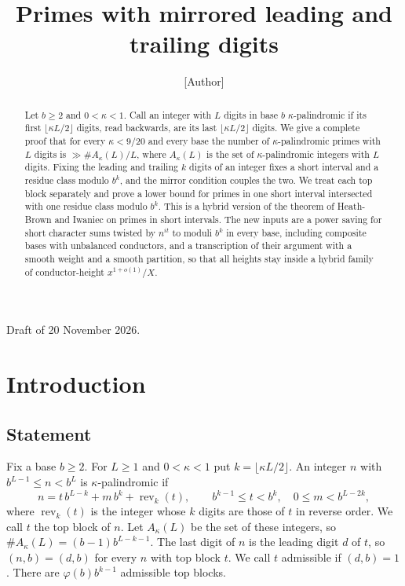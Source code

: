 \documentclass[11pt]{amsart}
\title{Primes with mirrored leading and trailing digits}
\author{[Author]}
\date{}
\theoremstyle{definition}
\numberwithin{equation}{section}
\newcommand{\rev}{\operatorname{rev}}
\begin{document}
\begin{abstract}
Let $b\ge2$ and $0<\kappa<1$. Call an integer with $L$ digits in base $b$ $\kappa$-palindromic if its first $\lfloor\kappa L/2\rfloor$ digits, read backwards, are its last $\lfloor\kappa L/2\rfloor$ digits. We give a complete proof that for every $\kappa<9/20$ and every base the number of $\kappa$-palindromic primes with $L$ digits is $\gg\#A_\kappa(L)/L$, where $A_\kappa(L)$ is the set of $\kappa$-palindromic integers with $L$ digits. Fixing the leading and trailing $k$ digits of an integer fixes a short interval and a residue class modulo $b^k$, and the mirror condition couples the two. We treat each top block separately and prove a lower bound for primes in one short interval intersected with one residue class modulo $b^k$. This is a hybrid version of the theorem of Heath-Brown and Iwaniec on primes in short intervals. The new inputs are a power saving for short character sums twisted by $n^{it}$ to moduli $b^k$ in every base, including composite bases with unbalanced conductors, and a transcription of their argument with a smooth weight and a smooth partition, so that all heights stay inside a hybrid family of conductor-height $x^{1+o(1)}/X$.
\end{abstract}

\maketitle

\noindent Draft of 20 November 2026.

\section{Introduction}

\subsection{Statement}
Fix a base $b\ge2$. For $L\ge1$ and $0<\kappa<1$ put $k=\lfloor\kappa L/2\rfloor$. An integer $n$ with $b^{L-1}\le n<b^L$ is $\kappa$-palindromic if
\[
n=t\,b^{L-k}+m\,b^k+\rev_k(t),\qquad b^{k-1}\le t<b^k,\quad 0\le m<b^{L-2k},
\]
where $\rev_k(t)$ is the integer whose $k$ digits are those of $t$ in reverse order. We call $t$ the top block of $n$. Let $A_\kappa(L)$ be the set of these integers, so $\#A_\kappa(L)=(b-1)b^{L-k-1}$. The last digit of $n$ is the leading digit $d$ of $t$, so $(n,b)=(d,b)$ for every $n$ with top block $t$. We call $t$ admissible if $(d,b)=1$. There are $\varphi(b)b^{k-1}$ admissible top blocks.
\end{document}
